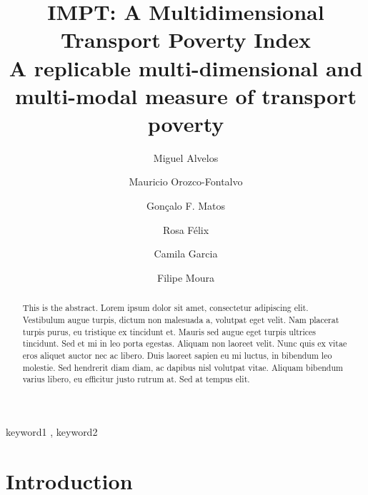 \documentclass[
  authoryear,
  review,
  1p]{elsarticle}
\begin{document}
\begin{frontmatter}
\title{IMPT: A Multidimensional Transport Poverty Index \\\large{A
replicable multi-dimensional and multi-modal measure of transport
poverty} }
\author[1]{Miguel Alvelos%
%
}
\author[1]{Mauricio Orozco-Fontalvo%
%
}
\author[1]{Gonçalo F. Matos%
%
}
\author[1]{Rosa Félix%
%
}
\author[2]{Camila Garcia%
%
}
\author[]{Filipe Moura%
%
}








        
\begin{abstract}
This is the abstract. Lorem ipsum dolor sit amet, consectetur adipiscing
elit. Vestibulum augue turpis, dictum non malesuada a, volutpat eget
velit. Nam placerat turpis purus, eu tristique ex tincidunt et. Mauris
sed augue eget turpis ultrices tincidunt. Sed et mi in leo porta
egestas. Aliquam non laoreet velit. Nunc quis ex vitae eros aliquet
auctor nec ac libero. Duis laoreet sapien eu mi luctus, in bibendum leo
molestie. Sed hendrerit diam diam, ac dapibus nisl volutpat vitae.
Aliquam bibendum varius libero, eu efficitur justo rutrum at. Sed at
tempus elit.
\end{abstract}





\begin{keyword}
    keyword1 \sep 
    keyword2
\end{keyword}
\end{frontmatter}
    

\section{Introduction}\label{sec-introduction}
\end{document}
